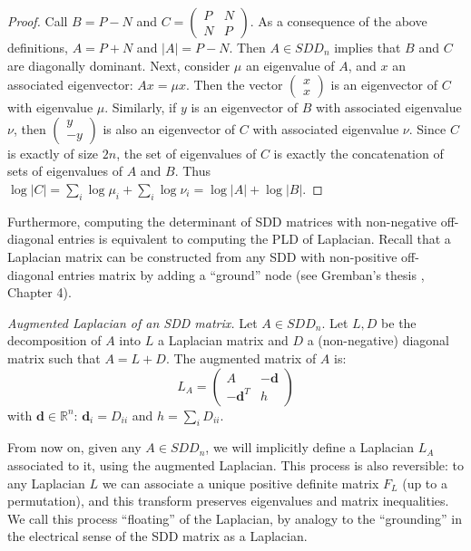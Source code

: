 \begin{proof} Call $B=P-N$ and $C=\left(\begin{array}{cc}
P & N\\
N & P
\end{array}\right)$. As a consequence of the above definitions, $A=P+N$ and $\left|A\right| = P - N$. Then $A \in SDD_{n}$ implies that $B$ and $C$ are diagonally dominant. Next, consider $\mu$ an eigenvalue of $A$, and $x$ an associated eigenvector:
$Ax=\mu x$. Then the vector $\left(\begin{array}{c}
x\\
x
\end{array}\right)$
is an eigenvector of $C$ with eigenvalue $\mu$. Similarly, if $y$ is an eigenvector of $B$ with associated eigenvalue $\nu$, then $\left(\begin{array}{c}
y\\
-y
\end{array}\right)$ is also an eigenvector of $C$ with associated eigenvalue $\nu$. Since $C$ is exactly of size $2n$, the set of eigenvalues of $C$
is exactly the concatenation of sets of eigenvalues of $A$ and $B$.
Thus $\log\left|C\right|=\sum_{i}\log\mu_{i}+\sum_{i}\log\nu_{i}=\log\left|A\right|+\log\left|B\right|$.
\end{proof}

Furthermore, computing the determinant of SDD matrices with non-negative
off-diagonal entries is equivalent to computing the PLD of Laplacian.
Recall that a Laplacian matrix can be constructed from any SDD with
non-positive off-diagonal entries matrix by adding a ``ground''
node (see Gremban's thesis \cite{Gremban1996}, Chapter 4).

\begin{definition} \emph{Augmented Laplacian of an SDD matrix.} Let
$A\in SDD_{n}$. Let $L,D$ be the decomposition of $A$ into $L$
a Laplacian matrix and $D$ a (non-negative) diagonal matrix such
that $A=L+D$. The augmented matrix of $A$ is: 
\[
L_{A}=\left(\begin{array}{cc}
A & -\mathbf{d}\\
-\mathbf{d}^{T} & h
\end{array}\right)
\]
with $\mathbf{d}\in\mathbb{R}^{n}$: $\mathbf{d}_{i}=D_{ii}$ and
$h=\sum_{i}D_{ii}$. \end{definition}

From now on, given any $A\in SDD_{n}$, we will implicitly define
a Laplacian $L_{A}$ associated to it, using the augmented Laplacian.
This process is also reversible: to any Laplacian $L$ we can associate
a unique positive definite matrix $F_{L}$ (up to a permutation),
and this transform preserves eigenvalues and matrix inequalities.
We call this process ``floating'' of the Laplacian, by analogy to
the ``grounding'' in the electrical sense of the SDD matrix as a
Laplacian.

